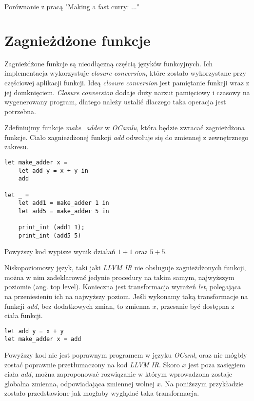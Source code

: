 \documentclass[declaration,shortabstract]{iithesis}
\begin{document}
Porównanie z pracą "Making a fast curry: ..."

\section{Zagnieżdżone funkcje}

Zagnieżdżone funkcje są nieodłączną częścią języków funkcyjnych. Ich implementacja wykorzystuje 
\textit{closure conversion}, które zostało wykorzystane przy częściowej aplikacji funkcji. 
Ideą \textit{closure conversion} jest pamiętanie funkcji wraz z jej domknięciem. 
\textit{Closure conversion} dodaje duży narzut pamięciowy i czasowy na wygenerowany program,
dlatego należy ustalić dlaczego taka operacja jest potrzebna.

Zdefiniujmy funkcje \textit{make\_adder} w \textit{OCamlu}, która będzie zwracać zagnieżdżona funkcje.
Ciało zagnieżdżonej funkcji \textit{add} odwołuje się do zmiennej z zewnętrznego zakresu.

\begin{lstlisting}[frame=single, caption={Zagnieżdżona funkcja w \textit{OCamlu}}]
let make_adder x = 
    let add y = x + y in 
    add 
  
let _ = 
    let add1 = make_adder 1 in 
    let add5 = make_adder 5 in 
    
    print_int (add1 1);
    print_int (add5 5) 
\end{lstlisting}
Powyższy kod wypisze wynik działań $1 + 1$ oraz $5 + 5$. 

Niskopoziomowy język, taki jaki \textit{LLVM IR} nie obsługuje zagnieżdżonych funkcji, można w
nim zadeklarować jedynie procedury na takim samym, najwyższym poziomie (ang. top level). 
Konieczna jest transformacja wyrażeń \textit{let}, polegająca na przeniesieniu ich na najwyższy poziom. 
Jeśli wykonamy taką transformacje na funkcji \textit{add}, bez dodatkowych zmian, to zmienna $x$,
przesanie być dostępna z ciała funkcji.

\begin{lstlisting}[frame=single, caption={Po przeniesieniu funkcji \textit{add} na najwyższy poziom}]
let add y = x + y 
let make_adder x = add 
\end{lstlisting}

Powyższy kod nie jest poprawnym programem w języku \textit{OCaml}, oraz 
nie mógbły zostać poprawnie przetłumaczony na kod \textit{LLVM IR}. 
Skoro $x$ jest poza zasięgiem ciała \textit{add}, można zaproponować rozwiązanie w którym 
wprowadzona zostaje globalna zmienna, odpowiadająca zmiennej wolnej $x$. 
Na poniższym przykładzie zostało przedstawione jak mogłaby wyglądać taka transformacja.
\end{document}
